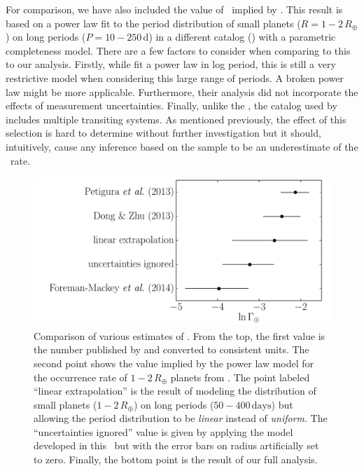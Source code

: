 For comparison, we have also included the value of \gammaearth\ implied by
\citet[][their Table 2]{Dong:2013}.
This result is based on a power law fit to the period distribution of small
planets ($R=1-2\,R_\oplus$) on long periods ($P=10-250\,\mathrm{d}$) in a
different catalog (\citealt{Batalha:2013}) with a parametric completeness
model.
There are a few factors to consider when comparing to this to our analysis.
Firstly, while \citet{Dong:2013} fit a power law in log period, this is still a
very restrictive model when considering this large range of periods.
A broken power law might be more applicable.
Furthermore, their analysis did not incorporate the effects of measurement
uncertainties.
Finally, unlike the \citet{Petigura:2013}, the \citet{Batalha:2013} catalog used
by \citet{Dong:2013} includes multiple transiting systems.
As mentioned previously, the effect of this selection is hard to determine
without further investigation but it should, intuitively, cause any inference
based on the \citet{Petigura:2013} sample to be an underestimate of the \True\
rate.

\begin{figure}[p]
\begin{center}
\includegraphics[width=\textwidth]{figures/exopop/comparison.pdf}
\end{center}
\caption{%
Comparison of various estimates of \gammaearth.
From the top, the first value is the number published by \citet{Petigura:2013} and
converted to consistent units.
The second point shows the value implied by the power law model for the
occurrence rate of $1-2\,R_\oplus$ planets from \citet{Dong:2013}.
The point labeled ``linear extrapolation'' is the result of modeling the
distribution of small planets ($1-2\,R_\oplus$) on long periods
($50-400\,\mathrm{days}$) but allowing the period distribution to be
\emph{linear} instead of \emph{uniform}.
The ``uncertainties ignored'' value is given by applying the model
developed in this \paper\ but with the error bars on radius artificially
set to zero.
Finally, the bottom point is the result of our full analysis.
}
\end{figure}

